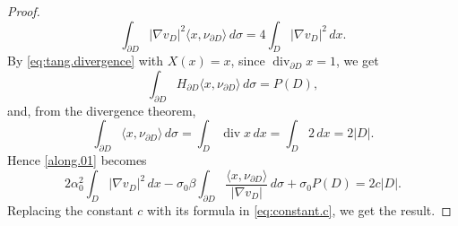 \documentclass[10pt,a4paper]{amsart}
\renewcommand{\div}{\operatorname{div}} %
\newcommand{\grad}{\nabla}
\newcommand{\la}{\langle}
\newcommand{\pa}{\partial}
\newcommand{\ra}{\rangle}
\begin{document}
\begin{proof}
\begin{equation}\label{eq:boundary.interior}
\int_{\pa D}|\nabla v_D|^2\la x,\nu_{\pa D}\ra \, d\sigma 
= 4 \int_{D}|\nabla v_D|^2\,dx.
\end{equation}
By \eqref{eq:tang.divergence} with $X(x)=x$, 
since $\div_{\pa D} x=1$, we get
\[
\int_{\pa D} H_{\pa D} \la x, \nu_{\pa D} \ra \, d\sigma = P(D), 
\]
and, from the divergence theorem, 
\[
\int_{\pa D} \la x, \nu_{\pa D} \ra \, d\sigma 
= \int_D \div x \, dx 
= \int_D 2 \, dx 
= 2 |D|.
\]
Hence \eqref{along.01} becomes 
\[
2 \alpha_0^2 \int_{D}|\nabla v_D|^2\,dx 
- \sigma_0 \beta \int_{\pa D} \frac{\la x, \nu_{\pa D} \ra }{ |\grad v_D| } \, d\sigma 
+ \sigma_0 P(D) = 2 c |D|.
\]
Replacing the constant $c$ with its formula in \eqref{eq:constant.c}, 
we get the result. 
\end{proof}
\end{document}
